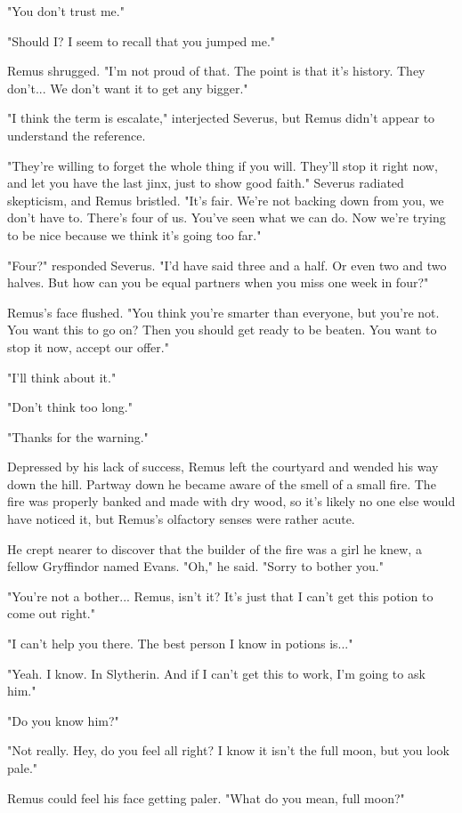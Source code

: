 \documentclass[a4paper,11pt]{article}
\begin{document}
"You don't trust me."

"Should I? I seem to recall that you jumped me."

Remus shrugged. "I'm not proud of that. The point is that it's history. They don't... We don't want it to get any bigger."

"I think the term is escalate," interjected Severus, but Remus didn't appear to understand the reference.

"They're willing to forget the whole thing if you will. They'll stop it right now, and let you have the last jinx, just to show good faith." Severus radiated skepticism, and Remus bristled. "It's fair. We're not backing down from you, we don't have to. There's four of us. You've seen what we can do. Now we're trying to be nice because we think it's going too far."

"Four?" responded Severus. "I'd have said three and a half. Or even two and two halves. But how can you be equal partners when you miss one week in four?"

Remus's face flushed. "You think you're smarter than everyone, but you're not. You want this to go on? Then you should get ready to be beaten. You want to stop it now, accept our offer."

"I'll think about it."

"Don't think too long."

"Thanks for the warning."

Depressed by his lack of success, Remus left the courtyard and wended his way down the hill. Partway down he became aware of the smell of a small fire. The fire was properly banked and made with dry wood, so it's likely no one else would have noticed it, but Remus's olfactory senses were rather acute.

He crept nearer to discover that the builder of the fire was a girl he knew, a fellow Gryffindor named Evans. "Oh," he said. "Sorry to bother you."

"You're not a bother... Remus, isn't it? It's just that I can't get this potion to come out right."

"I can't help you there. The best person I know in potions is..."

"Yeah. I know. In Slytherin. And if I can't get this to work, I'm going to ask him."

"Do you know him?"

"Not really. Hey, do you feel all right? I know it isn't the full moon, but you look pale."

Remus could feel his face getting paler. "What do you mean, full moon?"
\end{document}
